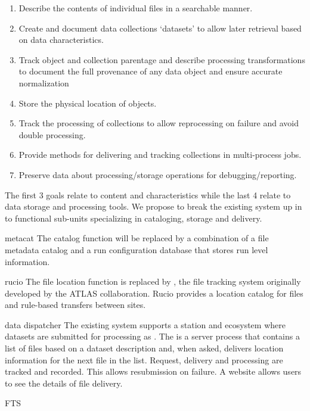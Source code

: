 \documentclass[../main-v1.tex]{subfiles}
\begin{document}
\begin{enumerate}

\item	Describe the contents of individual files in a searchable manner. 

\item	Create and document data collections `datasets' to allow later retrieval based on data characteristics.

 \item	Track object and collection parentage and describe processing transformations to document the full provenance of any data object and ensure accurate normalization


 \item	Store the physical  location of objects.

 \item	Track the processing of collections to allow reprocessing on failure and avoid double processing.

 \item	Provide methods for delivering and tracking collections in multi-process jobs.

 \item	Preserve data about processing/storage operations for debugging/reporting.

\end{enumerate}
The first 3 goals relate to content and characteristics while the last 4 relate to data storage and processing tools. We propose to break the existing system up in to functional sub-units specializing in cataloging, storage and delivery. 

\begin{description}
\item{metacat}  The catalog function will be replaced by a combination of a file metadata catalog  and a run configuration database that stores run level information.
\item{rucio}  The file location function is replaced by \cite{Barisits:2019fyl}, the file tracking system originally developed by the ATLAS collaboration. Rucio provides a location catalog for files and rule-based transfers between sites. 
\item{data dispatcher} The existing system supports a station and  ecosystem where datasets are submitted for processing as .  The  is a server process that contains a list of files based on a dataset description  and, when asked, delivers location information for the next file in the list.  Request, delivery and processing are tracked and recorded. This allows resubmission on failure. A website allows users to see the details of file delivery. 
\item{FTS} 

\end{description}
\end{document}
